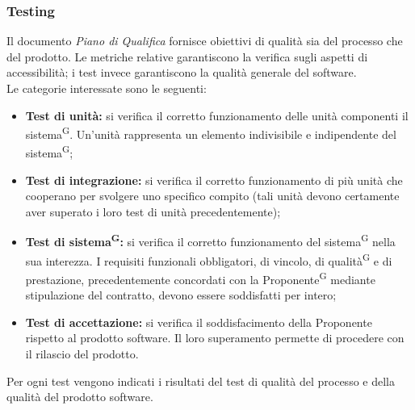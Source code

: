 \documentclass[8pt]{article}
\newcommand{\glossterm}[1]{#1\textsuperscript{G}} %
\begin{document}
\subsubsection{Testing}
Il documento \textit{Piano di Qualifica} fornisce obiettivi di qualità sia del processo che del prodotto. Le metriche relative garantiscono la verifica sugli aspetti di accessibilità; i test invece garantiscono la qualità generale del software. 
\\Le categorie interessate sono le seguenti:
\begin{itemize}
	\item \textbf{Test di unità:} si verifica il corretto funzionamento delle unità componenti il \glossterm{sistema}. Un’unità rappresenta un elemento indivisibile e indipendente del \glossterm{sistema}; 
	\item \textbf{Test di integrazione:} si verifica il corretto funzionamento di più unità che cooperano per svolgere uno specifico compito (tali unità devono certamente aver superato i loro test di unità precedentemente);
	\item \textbf{\glossterm{Test di sistema}:} si verifica il corretto funzionamento del \glossterm{sistema} nella sua interezza. I requisiti funzionali obbligatori, di vincolo, di \glossterm{qualità} e di prestazione, precedentemente concordati con la \glossterm{Proponente} mediante stipulazione del contratto, devono essere soddisfatti per intero;
	\item \textbf{Test di accettazione:} si verifica il soddisfacimento della Proponente rispetto al prodotto software. Il loro superamento permette di procedere con il rilascio del prodotto.
\end{itemize}
Per ogni test vengono indicati i risultati del test di qualità del processo e della qualità del prodotto software.
\end{document}

